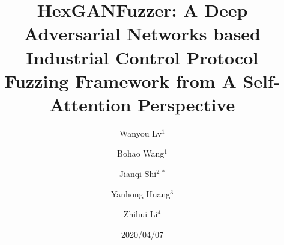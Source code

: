 \documentclass[conference]{IEEEtran}
\begin{document}
\title{HexGANFuzzer: A Deep Adversarial Networks based Industrial Control Protocol Fuzzing Framework from A Self-Attention Perspective \\}
%
\author{Wanyou Lv$^{1}$ \and
	Bohao Wang$^{1}$ \and
	Jianqi Shi$^{2,*}$ \and
	Yanhong Huang$^{3}$ \and
	Zhihui Li$^{4}$ 
}



\date{2020/04/07}



\maketitle
\end{document}

